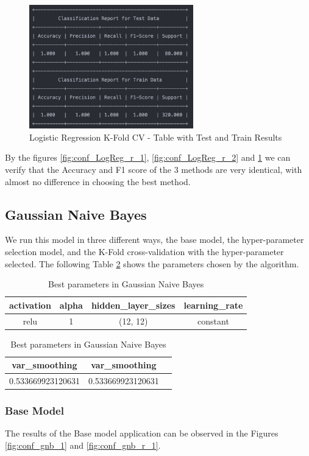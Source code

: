 \documentclass[conference]{IEEEtran}
\begin{document}
\begin{figure}[H]
    \centering
    \includegraphics[width=2.8in]{LogReg/logreg_r_3.png}%
    \caption{Logistic Regression K-Fold CV - Table with Test and Train Results}%
    \label{fig:conf_LogReg_r_3}%
\end{figure}

By the figures  \ref{fig:conf_LogReg_r_1}, \ref{fig:conf_LogReg_r_2} and \ref{fig:conf_LogReg_r_3} we can verify that the Accuracy and F1 score of the 3 methods are very identical, with almost no difference in choosing the best method.

\subsection{Gaussian Naive Bayes}

We run this model in three different ways, the base model, the hyper-parameter selection model, and the K-Fold cross-validation with the hyper-parameter selected. The following Table \ref{tab:tab2} shows the parameters chosen by the algorithm.

\begin{table}[H]
    \centering
    \caption{Best parameters in Gaussian Naive Bayes} 
    \begin{tabular}{||c c c c||} 
     \hline
     activation & alpha & hidden\_layer\_sizes & learning\_rate \\[0.5ex] 
     \hline\hline
     relu & 1 & (12, 12) & constant \\ 
    \hline
    \end{tabular}
    \begin{tabular}{||c c c||}
    \hline
    var_smoothing & var_smoothing \\ [0.5ex] 
    \hline\hline
     0.533669923120631 & 0.533669923120631 \\ 
    \hline
    \end{tabular}
    \label{tab:tab2}
\end{table}
\subsubsection{Base Model}
The results of the Base model application can be observed in the Figures \ref{fig:conf_gnb_1} and \ref{fig:conf_gnb_r_1}. 
\end{document}
